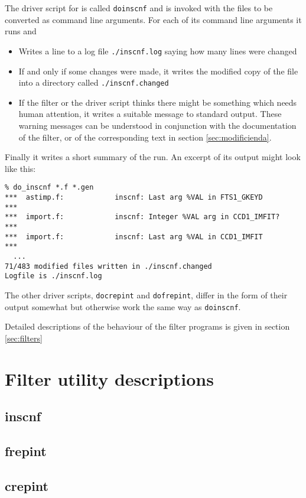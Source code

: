 \documentclass[twoside,11pt]{article}
\renewcommand{\_}{\texttt{\symbol{95}}}
\begin{document}
The driver script for  is called {\tt do\_inscnf}
and is invoked with the files to be converted as command line arguments.
For each of its command line arguments it runs  and
\begin{itemize}
\item Writes a line to a log file {\tt ./inscnf.log} 
      saying how many lines were changed
\item If and only if some changes were made, it writes the modified copy
      of the file into a directory called {\tt ./inscnf.changed}
\item If the filter or the driver script thinks there might be something 
      which needs human attention, it writes a suitable message to standard
      output.  These warning messages can be understood in conjunction 
      with the documentation of the filter, or of the corresponding 
      text in section \ref{sec:modificienda}.
\end{itemize}
Finally it writes a short summary of the run.
An excerpt of its output might look like this:
\begin{squote}
\begin{verbatim}
% do_inscnf *.f *.gen
***  astimp.f:            inscnf: Last arg %VAL in FTS1_GKEYD       ***
***  import.f:            inscnf: Integer %VAL arg in CCD1_IMFIT?   ***
***  import.f:            inscnf: Last arg %VAL in CCD1_IMFIT       ***
  ...
71/483 modified files written in ./inscnf.changed
Logfile is ./inscnf.log
\end{verbatim}
\end{squote}

The other driver scripts, {\tt do\_crepint} and {\tt do\_frepint},
differ in the form of their output somewhat but otherwise work the
same way as {\tt do\_inscnf}.

Detailed descriptions of the behaviour of the filter programs is
given in section \ref{sec:filters}

\section{Filter utility descriptions\label{sec:filters}}

\subsection{inscnf}
\subsection{frepint}
\subsection{crepint}






\end{document}
